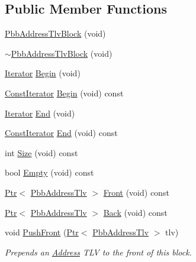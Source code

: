 \subsection*{Public Member Functions}
\begin{DoxyCompactItemize}
\item 
\hyperlink{classns3_1_1PbbAddressTlvBlock_ae02bb0ea4766a4d247fcd10139ecdcd2}{Pbb\+Address\+Tlv\+Block} (void)
\item 
\hyperlink{classns3_1_1PbbAddressTlvBlock_a903f18888040b4f3924834e3def19430}{$\sim$\+Pbb\+Address\+Tlv\+Block} (void)
\item 
\hyperlink{classns3_1_1PbbAddressTlvBlock_a3291c01bdaccabd163f5b65b64c981da}{Iterator} \hyperlink{classns3_1_1PbbAddressTlvBlock_a4d9d3846d06745bc301a9272c2f9a345}{Begin} (void)
\item 
\hyperlink{classns3_1_1PbbAddressTlvBlock_a48fa2760ff5fae1a550680b0ace7403b}{Const\+Iterator} \hyperlink{classns3_1_1PbbAddressTlvBlock_aa981827b959f90428f6047771fdb4d0d}{Begin} (void) const 
\item 
\hyperlink{classns3_1_1PbbAddressTlvBlock_a3291c01bdaccabd163f5b65b64c981da}{Iterator} \hyperlink{classns3_1_1PbbAddressTlvBlock_a0c951ec0f43ba437b2d986e8de6ece9f}{End} (void)
\item 
\hyperlink{classns3_1_1PbbAddressTlvBlock_a48fa2760ff5fae1a550680b0ace7403b}{Const\+Iterator} \hyperlink{classns3_1_1PbbAddressTlvBlock_a794d6e7059514ce0dee31fe8e60cfca1}{End} (void) const 
\item 
int \hyperlink{classns3_1_1PbbAddressTlvBlock_ac53e76c6db6595b66919404c8fda701f}{Size} (void) const 
\item 
bool \hyperlink{classns3_1_1PbbAddressTlvBlock_a2112d307a1d14c96e03c3b91284a9e67}{Empty} (void) const 
\item 
\hyperlink{classns3_1_1Ptr}{Ptr}$<$ \hyperlink{classns3_1_1PbbAddressTlv}{Pbb\+Address\+Tlv} $>$ \hyperlink{classns3_1_1PbbAddressTlvBlock_ac927de27a4059462d63b85b383ac7d6b}{Front} (void) const 
\item 
\hyperlink{classns3_1_1Ptr}{Ptr}$<$ \hyperlink{classns3_1_1PbbAddressTlv}{Pbb\+Address\+Tlv} $>$ \hyperlink{classns3_1_1PbbAddressTlvBlock_ace84018bdc06463241c5354823413873}{Back} (void) const 
\item 
void \hyperlink{classns3_1_1PbbAddressTlvBlock_ae8e5b44de8051397d6582067970e6f5f}{Push\+Front} (\hyperlink{classns3_1_1Ptr}{Ptr}$<$ \hyperlink{classns3_1_1PbbAddressTlv}{Pbb\+Address\+Tlv} $>$ tlv)
\begin{DoxyCompactList}\small\item\em Prepends an \hyperlink{classns3_1_1Address}{Address} T\+LV to the front of this block. \end{DoxyCompactList}\item 

\end{DoxyCompactItemize}
